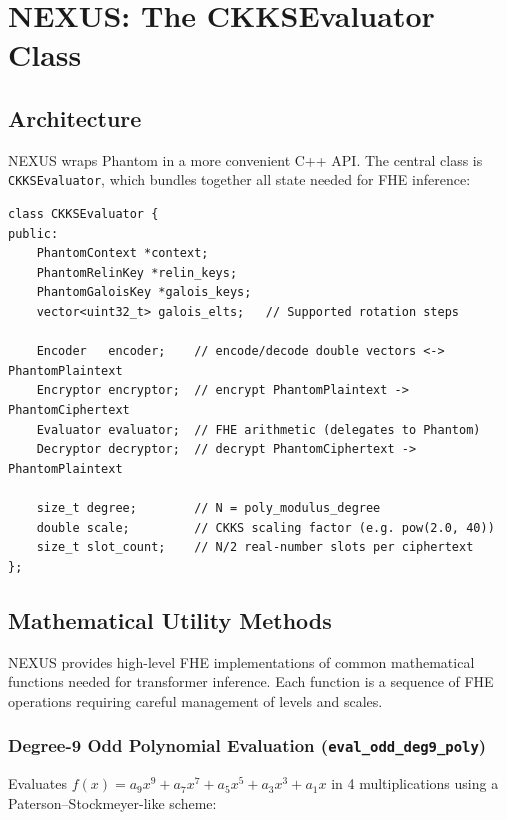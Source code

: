 \documentclass[11pt,letterpaper]{article}
\begin{document}
\section{NEXUS: The CKKSEvaluator Class}
\label{sec:nexus-eval}

\subsection{Architecture}

NEXUS wraps Phantom in a more convenient C++ API. The central class is \texttt{CKKSEvaluator},
which bundles together all state needed for FHE inference:

\begin{lstlisting}[style=cpp, caption=CKKSEvaluator interface (ckks\_evaluator.cuh)]
class CKKSEvaluator {
public:
    PhantomContext *context;
    PhantomRelinKey *relin_keys;
    PhantomGaloisKey *galois_keys;
    vector<uint32_t> galois_elts;   // Supported rotation steps

    Encoder   encoder;    // encode/decode double vectors <-> PhantomPlaintext
    Encryptor encryptor;  // encrypt PhantomPlaintext -> PhantomCiphertext
    Evaluator evaluator;  // FHE arithmetic (delegates to Phantom)
    Decryptor decryptor;  // decrypt PhantomCiphertext -> PhantomPlaintext

    size_t degree;        // N = poly_modulus_degree
    double scale;         // CKKS scaling factor (e.g. pow(2.0, 40))
    size_t slot_count;    // N/2 real-number slots per ciphertext
};
\end{lstlisting}

\subsection{Mathematical Utility Methods}

NEXUS provides high-level FHE implementations of common mathematical functions needed for
transformer inference. Each function is a sequence of FHE operations requiring careful
management of levels and scales.

\subsubsection{Degree-9 Odd Polynomial Evaluation (\texttt{eval\_odd\_deg9\_poly})}

Evaluates $f(x) = a_9 x^9 + a_7 x^7 + a_5 x^5 + a_3 x^3 + a_1 x$ in 4
multiplications using a Paterson--Stockmeyer-like scheme:
\end{document}
